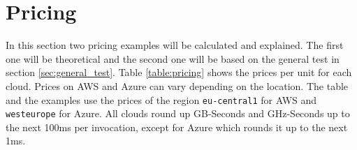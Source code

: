 \begin{table}[htp]
\centering
\captionsetup[table]{justification=centering, labelfont=bf}
\caption[Load tests that achieved less than 90\% of RPS]{Load tests that achieved less than 90\% of RPS}
\label{table:rps}
\end{table}

\section{Pricing}
\label{sec:pricing}
In this section two pricing examples will be calculated and explained. The first one will be theoretical and the second one will be based on the general test in section \ref{sec:general_test}. Table \ref{table:pricing} shows the prices per unit for each cloud. Prices on \gls{AWS} and Azure can vary depending on the location. The table and the examples use the prices of the region \texttt{eu-central1} for \gls{AWS} and \texttt{westeurope} for Azure. All clouds round up GB-Seconds and GHz-Seconds up to the next 100ms per invocation, except for Azure which rounds it up to the next 1ms.

